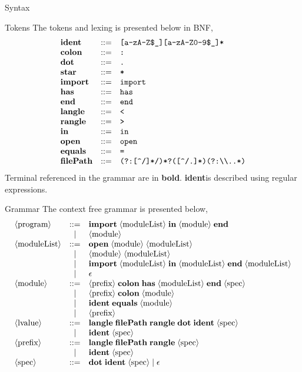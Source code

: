 \documentclass[11pt]{article}
\newcommand\DOT{\textbf{dot}}
\newcommand\COLON{\textbf{colon}}
\newcommand\STAR{\textbf{star}}
\newcommand\IDENT{\textbf{ident}}
\newcommand\HAS{\textbf{has}}
\newcommand\IMPORT{\textbf{import}}
\newcommand\END{\textbf{end}}
\newcommand\LANGLE{\textbf{langle}}
\newcommand\RANGLE{\textbf{rangle}}
\newcommand\IN{\textbf{in}}
\newcommand\OPEN{\textbf{open}}
\newcommand\EQ{\textbf{equals}}
\newcommand\FILEPATH{\textbf{filePath}}
\newcommand\nonterm[1]{\langle\textnormal{#1}\rangle}
\begin{document}
\begin{section}{Syntax}
\begin{subsection}{Tokens}
The tokens and lexing is presented below in BNF, 
\[
\begin{array}{lcl}
\IDENT & ::= & \verb|[a-zA-Z$_][a-zA-Z0-9$_]*|\\
\COLON & ::= & \verb|:|\\
\DOT & ::= & \verb|.|\\
\STAR & ::= & \verb|*|\\
\IMPORT & ::= &\verb|import|\\
\HAS & ::= & \verb|has|\\
\END & ::= &\verb|end|\\
\LANGLE & ::= &\verb|<|\\
\RANGLE & ::= &\verb|>|\\
\IN & ::= &\verb|in|\\
\OPEN & ::= &\verb|open|\\
\EQ & ::= &\verb|=|\\
\FILEPATH & ::= &\verb"(?:[^/]*/)*?([^/.]*)(?:\\..*)"
\end{array}
\]
Terminal referenced in the grammar are in \textbf{bold}. \IDENT\;is described using regular expressions.\\
\end{subsection}
\begin{subsection}{Grammar}
The context free grammar is presented below,
\[
\begin{array}{lcl}
\nonterm{program} & ::= & \IMPORT\;\nonterm{moduleList}\;\IN\;\nonterm{module}\;\END\\
& | & \nonterm{module}\\ 
\nonterm{moduleList} & ::=  & \OPEN\;\nonterm{module}\;\nonterm{moduleList}\\
& | & \nonterm{module}\;\nonterm{moduleList}\\
& | & \IMPORT\;\nonterm{moduleList}\;\IN\;\nonterm{moduleList}\;\END\;\nonterm{moduleList}\\
& | & \epsilon\\
\nonterm{module} & ::= & \nonterm{prefix}\;\COLON\;\HAS\;\nonterm{moduleList}\;\END\;\nonterm{spec}\\
& | & \nonterm{prefix}\;\COLON\;\nonterm{module}\\
& | & \IDENT\;\EQ\;\nonterm{module}\\
& | & \nonterm{prefix}\\
\nonterm{lvalue} & ::= & \LANGLE\;\FILEPATH\;\RANGLE\;\DOT\;\IDENT\;\nonterm{spec}\\
& | & \IDENT\;\nonterm{spec}\\
\nonterm{prefix} & ::= & \LANGLE\;\FILEPATH\;\RANGLE\;\nonterm{spec}\\
& | & \IDENT\;\nonterm{spec}\\
\nonterm{spec} & ::= & \DOT\;\IDENT\;\nonterm{spec}\;|\;\epsilon
\end{array}
\]


\end{subsection}
\end{section}
\end{document}
